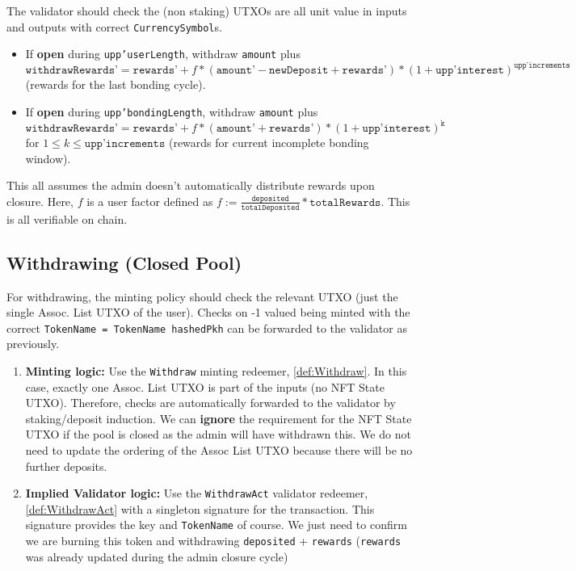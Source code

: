 \documentclass[10pt, a4paper]{article}
\theoremstyle{definition}
\begin{document}
\begin{enumerate}
{The validator should check the (non staking) UTXOs are all unit value in inputs and outputs with correct \texttt{CurrencySymbol}s.

\begin{itemize}
\item{If \textbf{open} during \texttt{upp'userLength}, withdraw \texttt{amount} plus \\ $\texttt{withdrawRewards'} = \texttt{rewards'} + f * (\texttt{amount'} - \texttt{newDeposit} +  \texttt{rewards'})* (1 + \texttt{upp'interest})^\texttt{upp'increments}$
(rewards for the last bonding cycle).}
\item{If \textbf{open} during \texttt{upp'bondingLength}, withdraw \texttt{amount} plus \\ $\texttt{withdrawRewards'} = \texttt{rewards'} + f * (\texttt{amount'} + \texttt{rewards'})* (1 + \texttt{upp'interest})^\texttt{k}$ for $1 \le k \le \texttt{upp'increments}$ (rewards for current incomplete bonding window).}
\end{itemize}

This all assumes the admin doesn't automatically distribute rewards upon closure. Here, $f$ is a user factor defined as $f := \frac{\texttt{deposited}}{\texttt{totalDeposited}} * \texttt{totalRewards}$. This is all verifiable on chain.
}
\end{enumerate}

\subsection{Withdrawing (\textbf{Closed Pool})}\label{subsection:WithdrawingClosed}

For withdrawing, the minting policy should check the relevant UTXO (just the single Assoc. List UTXO of the user). Checks on -1 valued being minted with the correct \texttt{TokenName = TokenName hashedPkh} can be forwarded to the validator as previously.

\begin{enumerate}
\item{\textbf{Minting logic:} Use the \texttt{Withdraw} minting redeemer, \ref{def:Withdraw}. In this case, exactly one Assoc. List UTXO is part of the inputs (no NFT State UTXO). Therefore, checks are automatically forwarded to the validator by staking/deposit induction. We can \textbf{ignore} the requirement for the NFT State UTXO if the pool is closed as the admin will have withdrawn this. We do not need to update the ordering of the Assoc List UTXO because there will be no further deposits. }
\item{\textbf{Implied Validator logic:} Use the \texttt{WithdrawAct} validator redeemer, \ref{def:WithdrawAct} with a singleton signature for the transaction. This signature provides the key and \texttt{TokenName} of course. We just need to confirm we are burning this token and withdrawing \texttt{deposited} + \texttt{rewards} (\texttt{rewards} was already updated during the admin closure cycle)}

\end{enumerate}
\end{document}
